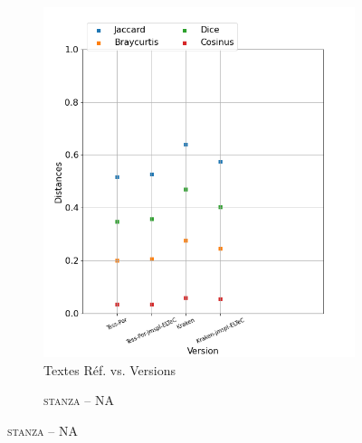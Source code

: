 \begin{figure}[H]
\begin{minipage}{6cm}
  \begin{subfigure}{0.89\textwidth}
  \includegraphics[width=.89\textwidth]{IMAGES/ELTeC_DISTANCES_spaCy3.5.1/DE-QUEIROS-CRIME-graph-dist-spaCy3.5.1-txt.png} 
  \caption{Textes Réf. vs. Versions}
  \label{fig:DE-QUEIROS-CRIME-graph-dist-txt}
  \end{subfigure}
  \end{minipage}
  \begin{minipage}{6cm}
  \begin{subfigure}{0.89\textwidth}
   \caption{\textsc{stanza -- NA}}
 

\end{subfigure}
\end{minipage}
\end{figure}
